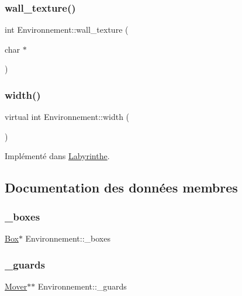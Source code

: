 \subsubsection{\texorpdfstring{wall\+\_\+texture()}{wall\_texture()}}
{\footnotesize\ttfamily int Environnement\+::wall\+\_\+texture (\begin{DoxyParamCaption}\item[{char $\ast$}]{ }\end{DoxyParamCaption})}

\mbox{\label{classEnvironnement_a9f5945b3cde5bd2b0d46250446989081}} 
\subsubsection{\texorpdfstring{width()}{width()}}
{\footnotesize\ttfamily virtual int Environnement\+::width (\begin{DoxyParamCaption}{ }\end{DoxyParamCaption})\hspace{0.3cm}{\ttfamily [pure virtual]}}



Implémenté dans \hyperlink{classLabyrinthe_a55373ffb068b7f84c24108ce0f7d111c}{Labyrinthe}.



\subsection{Documentation des données membres}
\mbox{\label{classEnvironnement_ab32874eb0b8a28d5bde0b2d46bae6115}} 
\subsubsection{\texorpdfstring{\+\_\+boxes}{\_boxes}}
{\footnotesize\ttfamily \hyperlink{structBox}{Box}$\ast$ Environnement\+::\+\_\+boxes}

\mbox{\label{classEnvironnement_a9dca8e24e5dde03341cb9a2156232906}} 
\subsubsection{\texorpdfstring{\+\_\+guards}{\_guards}}
{\footnotesize\ttfamily \hyperlink{classMover}{Mover}$\ast$$\ast$ Environnement\+::\+\_\+guards}

